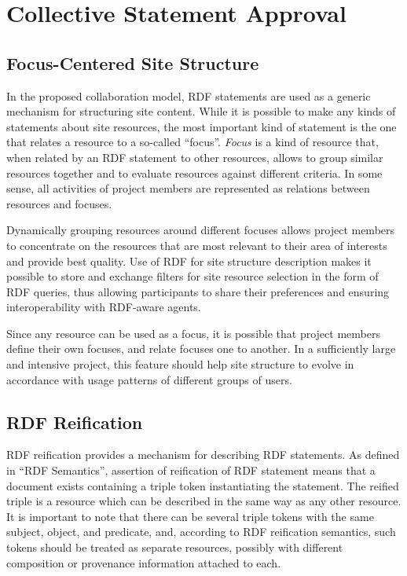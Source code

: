 \documentclass{llncs}
\begin{document}
\section{Collective Statement Approval}
%
\subsection{Focus-Centered Site Structure}

In the proposed collaboration model, RDF statements are used as a generic
mechanism for structuring site content. While it is possible to make any kinds
of statements about site resources, the most important kind of statement is
the one that relates a resource to a so-called ``focus''\cite{concepts}.
\emph{Focus} is a kind of resource that, when related by an RDF statement to
other resources, allows to group similar resources together and to evaluate
resources against different criteria. In some sense, all activities of project
members are represented as relations between resources and focuses.

Dynamically grouping resources around different focuses allows project members
to concentrate on the resources that are most relevant to their area of
interests and provide best quality. Use of RDF for site structure description
makes it possible to store and exchange filters for site resource selection in
the form of RDF queries, thus allowing participants to share their preferences
and ensuring interoperability with RDF-aware agents.

Since any resource can be used as a focus, it is possible that project members
define their own focuses, and relate focuses one to another. In a sufficiently
large and intensive project, this feature should help site structure to evolve
in accordance with usage patterns of different groups of users.

\subsection{RDF Reification}

RDF reification provides a mechanism for describing RDF statements. As defined
in ``RDF Semantics''\cite{rdf-mt}, assertion of reification of RDF statement
means that a document exists containing a triple token instantiating the
statement. The reified triple is a resource which can be described in the same
way as any other resource. It is important to note that there can be several
triple tokens with the same subject, object, and predicate, and, according to
RDF reification semantics, such tokens should be treated as separate
resources, possibly with different composition or provenance information
attached to each.
\end{document}
